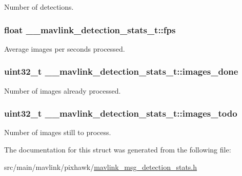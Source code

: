 Number of detections. 

\hypertarget{struct____mavlink__detection__stats__t_a45e8c045fa4fabc6cd423d42d46e793a}{
\subsubsection[{fps}]{\setlength{\rightskip}{0pt plus 5cm}float \+\_\+\+\_\+mavlink\+\_\+detection\+\_\+stats\+\_\+t\+::fps}}\label{struct____mavlink__detection__stats__t_a45e8c045fa4fabc6cd423d42d46e793a}


Average images per seconds processed. 

\hypertarget{struct____mavlink__detection__stats__t_ace2decc25407ced8c6d83e0789c2f131}{
\subsubsection[{images\+\_\+done}]{\setlength{\rightskip}{0pt plus 5cm}uint32\+\_\+t \+\_\+\+\_\+mavlink\+\_\+detection\+\_\+stats\+\_\+t\+::images\+\_\+done}}\label{struct____mavlink__detection__stats__t_ace2decc25407ced8c6d83e0789c2f131}


Number of images already processed. 

\hypertarget{struct____mavlink__detection__stats__t_a662c03428bd35ed0704c1d13c935f401}{
\subsubsection[{images\+\_\+todo}]{\setlength{\rightskip}{0pt plus 5cm}uint32\+\_\+t \+\_\+\+\_\+mavlink\+\_\+detection\+\_\+stats\+\_\+t\+::images\+\_\+todo}}\label{struct____mavlink__detection__stats__t_a662c03428bd35ed0704c1d13c935f401}


Number of images still to process. 



The documentation for this struct was generated from the following file\+:\begin{DoxyCompactItemize}
\item 
src/main/mavlink/pixhawk/\hyperlink{mavlink__msg__detection__stats_8h}{mavlink\+\_\+msg\+\_\+detection\+\_\+stats.\+h}\end{DoxyCompactItemize}
